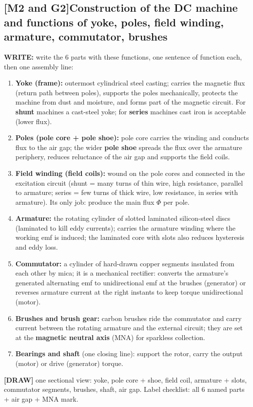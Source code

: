 \documentclass[11pt]{article}
\newcommand{\q}[2]{\subsection*{\color{copper}#1\quad\color{iron}#2}}
\newcommand{\w}[1]{\textbf{\color{copper}WRITE:} #1}
\newcommand{\dw}[1]{\textbf{\color{muted}[DRAW]} #1}
\begin{document}
\q{[M2 and G2]}{Construction of the DC machine and functions of yoke, poles, field winding, armature, commutator, brushes}
\w{write the 6 parts with these functions, one sentence of function each, then one assembly line:}
\begin{enumerate}[label=\arabic*.]
\item \textbf{Yoke (frame):} outermost cylindrical steel casting; carries the magnetic flux (return path between poles), supports the poles mechanically, protects the machine from dust and moisture, and forms part of the magnetic circuit. For \textbf{shunt} machines a cast-steel yoke; for \textbf{series} machines cast iron is acceptable (lower flux).
\item \textbf{Poles (pole core + pole shoe):} pole core carries the winding and conducts flux to the air gap; the wider \textbf{pole shoe} spreads the flux over the armature periphery, reduces reluctance of the air gap and supports the field coils.
\item \textbf{Field winding (field coils):} wound on the pole cores and connected in the excitation circuit (shunt = many turns of thin wire, high resistance, parallel to armature; series = few turns of thick wire, low resistance, in series with armature). Its only job: produce the main flux $\Phi$ per pole.
\item \textbf{Armature:} the rotating cylinder of slotted laminated silicon-steel discs (laminated to kill eddy currents); carries the armature winding where the working emf is induced; the laminated core with slots also reduces hysteresis and eddy loss.
\item \textbf{Commutator:} a cylinder of hard-drawn copper segments insulated from each other by mica; it is a mechanical rectifier: converts the armature's generated alternating emf to unidirectional emf at the brushes (generator) or reverses armature current at the right instants to keep torque unidirectional (motor).
\item \textbf{Brushes and brush gear:} carbon brushes ride the commutator and carry current between the rotating armature and the external circuit; they are set at the \textbf{magnetic neutral axis} (MNA) for sparkless collection.
\item \textbf{Bearings and shaft} (one closing line): support the rotor, carry the output (motor) or drive (generator) torque.
\end{enumerate}
\dw{one sectional view: yoke, pole core + shoe, field coil, armature + slots, commutator segments, brushes, shaft, air gap. Label checklist: all 6 named parts + air gap + MNA mark.}
\end{document}
